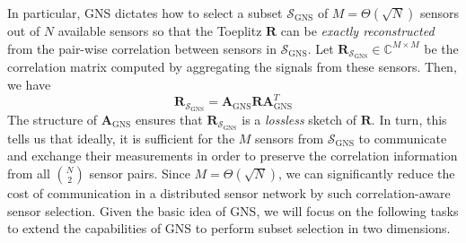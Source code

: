 In particular, GNS dictates how to select a subset $\mathcal{S}_{\text{GNS}}$ of $M = \Theta(\sqrt{N})$ sensors out of $N$ available sensors so that the Toeplitz $\mathbf{R}$ can be {\em exactly reconstructed} from the pair-wise correlation between sensors in $\mathcal{S}_{\text{GNS}}$. Let $\mathbf{R}_{\mathcal{S}_{\text{GNS}}} \in \mathbb{C}^{M\times M}$ be the correlation matrix computed by aggregating the signals from these sensors. Then, we have 
\begin{equation}
\mathbf{R}_{\mathcal{S}_{\text{GNS}}} = \mathbf{A}_{\text{GNS}} \mathbf{R} \mathbf{A}^T_{\text{GNS}} 
\end{equation}
The structure of $\mathbf{A}_{\text{GNS}}$ ensures that $\mathbf{R}_{\mathcal{S}_{\text{GNS}}}$ is a {\em lossless} sketch of  $\mathbf{R}$. In turn, this tells us that ideally, it is sufficient for the $M$ sensors from $\mathcal{S}_{\text{GNS}}$ to communicate and exchange their measurements in order to  preserve the correlation information from all $N\choose 2$ sensor pairs. Since $M = \Theta(\sqrt{N})$, we can significantly reduce the cost of communication in a distributed sensor network by such correlation-aware sensor selection. Given the basic idea of GNS, we will focus on the following tasks to extend the capabilities of GNS to perform subset selection in two dimensions.

